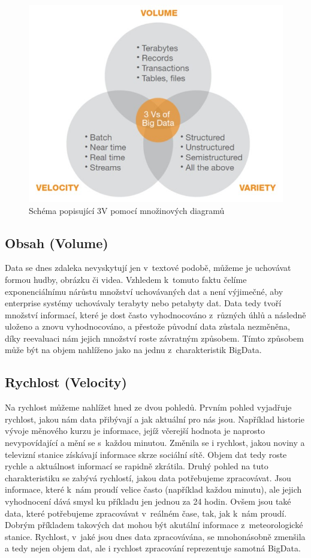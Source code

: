 \begin{figure}[h]
\centering
\includegraphics[scale=0.6]{images/3v}
\caption{Schéma popisující 3V pomocí množinových diagramů \cite{3vimg}}
\label{fig:3v}

\end{figure}

\subsection[3v-volume]{Obsah (Volume)}
Data se dnes zdaleka nevyskytují jen v~textové podobě, můžeme je uchovávat formou hudby, obrázku či videa. Vzhledem k~tomuto faktu čelíme exponenciálnímu nárůstu množství uchovávaných dat a není výjimečné, aby enterprise systémy uchovávaly terabyty nebo petabyty dat. Data tedy tvoří množství informací, které je dost často vyhodnocováno z~různých úhlů a následně uloženo a znovu vyhodnocováno, a přestože původní data zůstala nezměněna, díky reevaluaci nám jejich množství roste závratným způsobem. Tímto způsobem může být na objem nahlíženo jako na jednu z~charakteristik BigData.

\subsection{Rychlost (Velocity)}
Na rychlost můžeme nahlížet hned ze dvou pohledů. Prvním pohled vyjadřuje rychlost, jakou nám data přibývají a jak aktuální pro nás jsou. Například historie vývoje měnového kurzu je informace, jejíž včerejší hodnota je naprosto nevypovídající a mění se s~každou minutou. Změnila se i rychlost, jakou noviny a televizní stanice získávají informace skrze sociální sítě. Objem dat tedy roste rychle a aktuálnost informací se rapidně zkrátila. Druhý pohled na tuto charakteristiku se zabývá rychlostí, jakou data potřebujeme zpracovávat. Jsou informace, které k~nám proudí velice často (například každou minutu), ale jejich vyhodnocení dává smysl ku příkladu jen jednou za 24 hodin. Ovšem jsou také data, které potřebujeme zpracovávat v~reálném čase, tak, jak k~nám proudí. Dobrým příkladem takových dat mohou být akutální informace z~meteorologické stanice. 
Rychlost, v~jaké jsou dnes data zpracovávána, se mnohonásobně zmenšila a tedy nejen objem dat, ale i rychlost zpracování reprezentuje samotná BigData.

